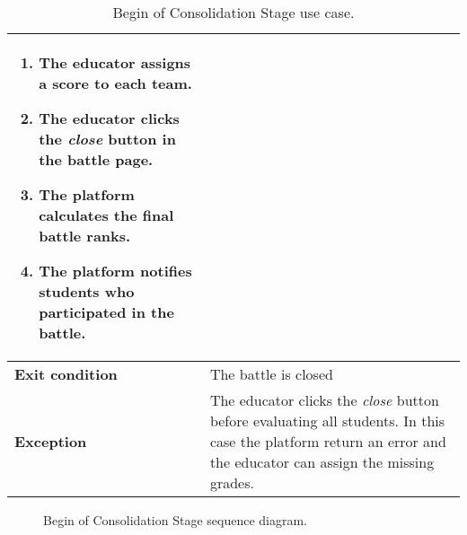 \begin{enumerate}[label=\textbf{UC\arabic*}:,leftmargin=1.3cm]
\begin{table}[H]
\begin{tabular}{|l|p{11.9cm}|}
\begin{enumerate}[label=\arabic*.]
                      \item The educator assigns a score to each team.
                      \item The educator clicks the \emph{close} button in the battle page.
                      \item The platform calculates the final battle ranks.
                      \item The platform notifies students who participated in the battle.
                  \end{enumerate}                 \\\hline
                  \textbf{Exit condition}  & The battle is closed                                                        \\\hline
                  \textbf{Exception}       & The educator clicks the \emph{close} button before evaluating all students.
                  In this case the platform return an error and the educator can assign the missing grades.              \\\hline
              \end{tabular}
              \caption{Begin of Consolidation Stage use case.}
              \label{table:Begin of Consolidation Stage}
          \end{table}

          \begin{figure}[H]
              \centering
              \caption{Begin of Consolidation Stage sequence diagram.}
              \label{fig:Begin of Consolidation Stage}
          \end{figure}

          \pagebreak


\end{enumerate}
